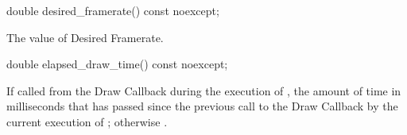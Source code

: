 \begin{itemdecl}
double desired_framerate() const noexcept;
\end{itemdecl}
\begin{itemdescr}
\pnum
\returns
The value of Desired Framerate.
\end{itemdescr}

\begin{itemdecl}
double elapsed_draw_time() const noexcept;
\end{itemdecl}
\begin{itemdescr}
\pnum
\returns
If called from the Draw Callback during the execution of , the amount of time in milliseconds that has passed since the previous call to the Draw Callback by the current execution of ; otherwise .
\end{itemdescr}
